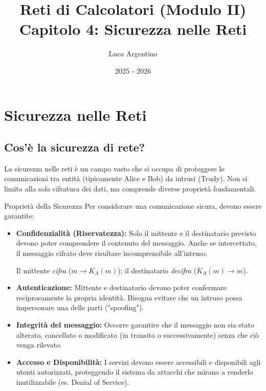 \documentclass[a4paper,12pt]{report}
\title{Reti di Calcolatori (Modulo II) \\ Capitolo 4: Sicurezza nelle Reti}
\author{Luca Argentino}
\date{2025 - 2026}
\begin{document}
              
\maketitle                    
\tableofcontents              
\newpage           

\setcounter{chapter}{3}

\chapter{Sicurezza nelle Reti}

\section{Cos'è la sicurezza di rete?}

La sicurezza nelle reti è un campo vasto che si occupa di proteggere le comunicazioni tra entità (tipicamente Alice e Bob) da intrusi (Trudy). Non si limita alla sola cifratura dei dati, ma comprende diverse proprietà fondamentali.

\begin{defbox}{Proprietà della Sicurezza}
Per considerare una comunicazione sicura, devono essere garantite:
\begin{itemize}
    \item \textbf{Confidenzialità (Riservatezza):} Solo il mittente e il destinatario previsto devono poter comprendere il contenuto del messaggio. Anche se intercettato, il messaggio cifrato deve risultare incomprensibile all'intruso.

     Il mittente \emph{cifra} ($m \to K_A(m)$); il destinatario \emph{decifra} ($K_A(m) \to m$).
    \item \textbf{Autenticazione:} Mittente e destinatario devono poter confermare reciprocamente la propria identità. Bisogna evitare che un intruso possa impersonare una delle parti ("spoofing").
    \item \textbf{Integrità del messaggio:} Occorre garantire che il messaggio non sia stato alterato, cancellato o modificato (in transito o successivamente) senza che ciò venga rilevato.
    \item \textbf{Accesso e Disponibilità:} I servizi devono essere accessibili e disponibili agli utenti autorizzati, proteggendo il sistema da attacchi che mirano a renderlo inutilizzabile (es. Denial of Service).
\end{itemize}
\end{defbox}
\end{document}
